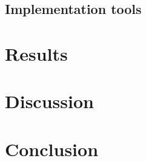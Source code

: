 \documentclass[pdftex,10pt,a4paper,oneside]{article}
\numberwithin{equation}{section}
\begin{document}
\subsection*{Implementation tools}

\newpage

\section{Results}\label{sec:4-results}
\newpage

\section{Discussion}\label{sec:5-discussion}
\newpage

\section{Conclusion}\label{sec:6-conclusion}
\newpage



\newpage


\end{document}
